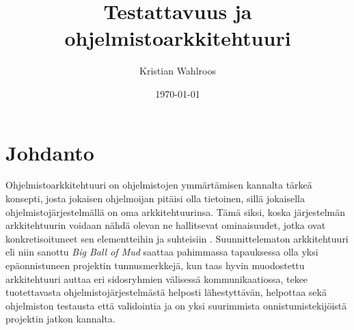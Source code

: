 \documentclass[finnish]{tktltiki2}
\title{Testattavuus ja ohjelmistoarkkitehtuuri}
\author{Kristian Wahlroos}
\date{\today}
\numberwithin{table}{section}
\theoremstyle{definition}
\theoremstyle{remark}
\begin{document}

\frontmatter      %

\maketitle        %
\makeabstract     %

\tableofcontents  %


\mainmatter       %

\section{Johdanto}









Ohjelmistoarkkitehtuuri on ohjelmistojen ymmärtämisen kannalta tärkeä konsepti, josta jokaisen ohjelmoijan pitäisi olla tietoinen, sillä jokaisella ohjelmistojärjestelmällä on oma arkkitehtuurinsa. Tämä siksi, koska järjestelmän arkkitehtuurin voidaan nähdä olevan ne hallitsevat ominaisuudet, jotka ovat konkretisoituneet sen elementteihin ja suhteisiin \citep[s. 2]{ISOIEEE42010}. Suunnittelematon arkkitehtuuri eli niin sanottu \textit{Big Ball of Mud} saattaa pahimmassa tapauksessa olla yksi epäonnistuneen projektin tunnusmerkkejä, kun taas hyvin muodostettu arkkitehtuuri auttaa eri sidosryhmien välisessä kommunikaatiossa, tekee tuotettavasta ohjelmistojärjestelmästä helposti lähestyttävän, helpottaa sekä ohjelmiston testausta että validointia ja on yksi suurimmista onnistumistekijöistä projektin jatkon kannalta. 
\end{document}
